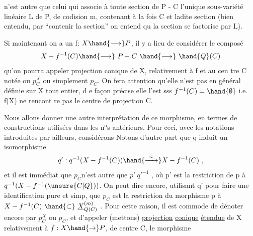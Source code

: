 
n'est autre que celui qui associe à toute section de  P - C  l'unique
sous-variété linéaire  L de P, de codision m, contenant à la fois C
et ladite section  (bien entendu, par ``contenir la section'' on entend qu
la section se factorise par L).

Si maintenant on a un f: $X \hand{\longrightarrow} P$,  il y a lieu de considérer le
composé
\[ X - f^{-1}(C) \hand{\longrightarrow}\ P - C \ \hand{\longrightarrow}\ \hand{Q}(C) \]
qu'on pourra appeler projection conique de X, relativement à f et au cen%
tre C\hand{,} notée  ou $p^{X}_{C}$ ou simplement $p_{C}$. On fera attention qu'elle n'est pas en général définie sur X tout
entier, d e façon précise elle l'est sss $f^{-1}(C)=\hand{\emptyset}$ i.e. f(X) ne rencont re
pas le centre de projection C. \hand{\unsure{/|)}}

Nous allons donner une autre interprétation de ce morphisme, en
termes de constructions utilisées dans les n$^{\text{o}}$s antérieurs.  Pour ceci,
avec les notations introduites par ailleurs, considérons
\diagram{\[
\begin{array}{ccc}
X & \overset{q}{\hand{\longleftarrow}} & \underline{X}^{(m)}_{\unsure{Q|G}(C)} = \underline{X}^{(m)}x_{\mathrm{Grass}^{m}}\hand{Q}(C) \\
 & & p\quad\hand{\downarrow} \\
 & & \hand{Q}(C) \quad .
\end{array}
\]}
Notons d'autre part que  q  induit un  isomorphisme
\[ q':q^{-1}(X-f^{-1}(C)) \hand{\xrightarrow{\ \sim\ }} X - f^{-1}(C) \ , \]
et il est immédiat que  $p_{C}$n'est autre  que   $p'\ q'^{-1}$ , où p' est la
restriction de  p à  $q^{-1}(X-f^{-1}(\unsure{C|Q}))$.  On peut dire encore, utilisant q'
pour faire une identification pure et simp, que  $p_{C}$ est la restriction
du morphisme p  à  $X - f^{-1}(C) \ \hand{\subset}\ \underline{X}^{(m)}_{Q(C)}$ . Pour cette raison, il est
commode de dénoter encore par  $p^{X}_{C}$ ou $p_{C}$, et d'appeler  (mettons)  \uline{projection}
\uline{conique}  \uline{étendue}  de X\hand{,} relativement à $f:X\hand{\rightarrow} P$, de centre C, le morphisme

